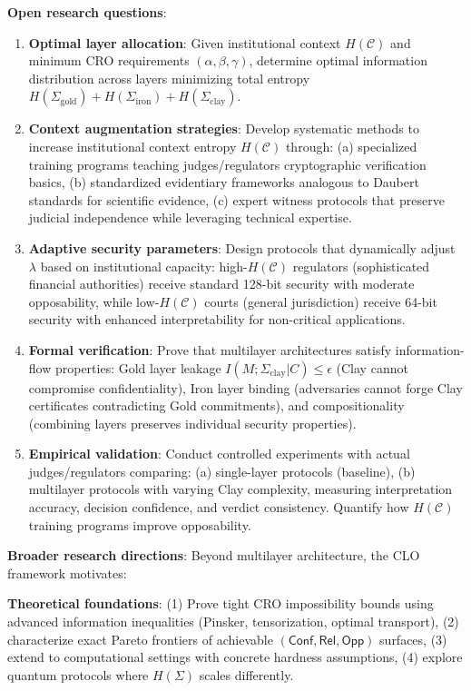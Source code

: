 \documentclass{ieeeaccess}
\begin{document}
\textbf{Open research questions}:
\begin{enumerate}
\item \textbf{Optimal layer allocation}: Given institutional context $H(\mathcal{C})$ and minimum CRO requirements $(\alpha, \beta, \gamma)$, determine optimal information distribution across layers minimizing total entropy $H(\Sigma_{\text{gold}}) + H(\Sigma_{\text{iron}}) + H(\Sigma_{\text{clay}})$.

\item \textbf{Context augmentation strategies}: Develop systematic methods to increase institutional context entropy $H(\mathcal{C})$ through: (a) specialized training programs teaching judges/regulators cryptographic verification basics, (b) standardized evidentiary frameworks analogous to Daubert standards for scientific evidence, (c) expert witness protocols that preserve judicial independence while leveraging technical expertise.

\item \textbf{Adaptive security parameters}: Design protocols that dynamically adjust $\lambda$ based on institutional capacity: high-$H(\mathcal{C})$ regulators (sophisticated financial authorities) receive standard 128-bit security with moderate opposability, while low-$H(\mathcal{C})$ courts (general jurisdiction) receive 64-bit security with enhanced interpretability for non-critical applications.

\item \textbf{Formal verification}: Prove that multilayer architectures satisfy information-flow properties: Gold layer leakage $I(M;\Sigma_{\text{clay}}|C) \leq \epsilon$ (Clay cannot compromise confidentiality), Iron layer binding (adversaries cannot forge Clay certificates contradicting Gold commitments), and compositionality (combining layers preserves individual security properties).

\item \textbf{Empirical validation}: Conduct controlled experiments with actual judges/regulators comparing: (a) single-layer protocols (baseline), (b) multilayer protocols with varying Clay complexity, measuring interpretation accuracy, decision confidence, and verdict consistency. Quantify how $H(\mathcal{C})$ training programs improve opposability.
\end{enumerate}

\textbf{Broader research directions}: Beyond multilayer architecture, the CLO framework motivates:

\textbf{Theoretical foundations}: (1) Prove tight CRO impossibility bounds using advanced information inequalities (Pinsker, tensorization, optimal transport), (2) characterize exact Pareto frontiers of achievable $(\mathsf{Conf}, \mathsf{Rel}, \mathsf{Opp})$ surfaces, (3) extend to computational settings with concrete hardness assumptions, (4) explore quantum protocols where $H(\Sigma)$ scales differently.
\end{document}
